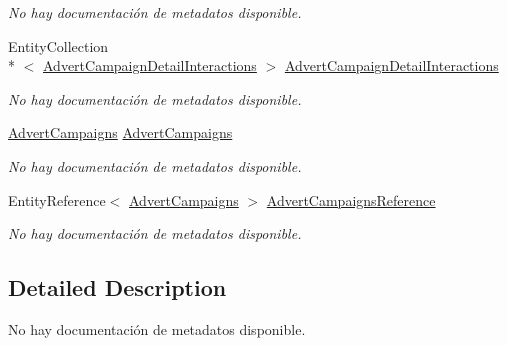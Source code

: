 \begin{DoxyCompactItemize}
\begin{DoxyCompactList}\small\item\em No hay documentación de metadatos disponible. \end{DoxyCompactList}\item 
Entity\-Collection\\*
$<$ \hyperlink{class_game_memory_1_1_advert_campaign_detail_interactions}{Advert\-Campaign\-Detail\-Interactions} $>$ \hyperlink{class_game_memory_1_1_advert_campaign_interactions_a76c26241b44be34ad0751c279509b2f3}{Advert\-Campaign\-Detail\-Interactions}
\begin{DoxyCompactList}\small\item\em No hay documentación de metadatos disponible. \end{DoxyCompactList}\item 
\hyperlink{class_game_memory_1_1_advert_campaigns}{Advert\-Campaigns} \hyperlink{class_game_memory_1_1_advert_campaign_interactions_a74c28d9fcf8c849a43a99292cfea1176}{Advert\-Campaigns}
\begin{DoxyCompactList}\small\item\em No hay documentación de metadatos disponible. \end{DoxyCompactList}\item 
Entity\-Reference$<$ \hyperlink{class_game_memory_1_1_advert_campaigns}{Advert\-Campaigns} $>$ \hyperlink{class_game_memory_1_1_advert_campaign_interactions_ab12596b7807a0658f0198e535a33ef2f}{Advert\-Campaigns\-Reference}
\begin{DoxyCompactList}\small\item\em No hay documentación de metadatos disponible. \end{DoxyCompactList}\end{DoxyCompactItemize}


\subsection{Detailed Description}
No hay documentación de metadatos disponible. 



